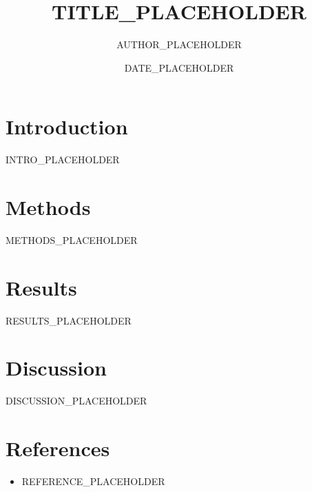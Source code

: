\documentclass[11pt]{article}
\title{TITLE_PLACEHOLDER}
\author{AUTHOR_PLACEHOLDER}
\date{DATE_PLACEHOLDER}
\begin{document}
\maketitle

\section{Introduction}
INTRO_PLACEHOLDER

\section{Methods}
METHODS_PLACEHOLDER

\section{Results}
%
RESULTS_PLACEHOLDER

\section{Discussion}
DISCUSSION_PLACEHOLDER

\section*{References}
\begin{itemize}
  \item REFERENCE_PLACEHOLDER
\end{itemize}
\end{document}
